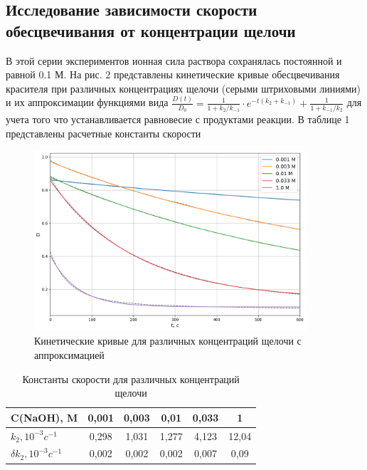 \documentclass[a4paper, 12pt]{article}
\begin{document}
\subsection{Исследование зависимости скорости обесцвечивания от концентрации щелочи}

В этой серии экспериментов ионная сила раствора сохранялась постоянной и равной 0.1 М. На рис. 2 представлены кинетические кривые обесцвечивания красителя при различных концентрациях щелочи (серыми штриховыми линиями) и их аппроксимации функциями вида $\frac{D(t)}{D_0} = \frac{1}{1+k_2/k_{-1}} \cdot e^{-t(k_2+k_{-1})} + \frac{1}{1+k_{-1}/k_2}$ для учета того что устанавливается равновесие с продуктами реакции. В таблице 1 представлены расчетные константы скорости
 \begin{figure}[h!]
    \begin{center}
    \includegraphics[width=0.9\textwidth]{fig2.png}
    \end{center}
    \caption{Кинетические кривые для различных концентраций щелочи с аппроксимацией}
\end{figure}

\begin{table}[h!]
\begin{center}
\caption{Константы скорости для различных концентраций щелочи}
\begin{tabular}{|l|c|c|c|c|c|}
\hline
C(NaOH), M               & 0,001 & 0,003 & 0,01  & 0,033 & 1     \\ \hline
$k_2, 10^{-3} c^{-1}$                       & 0,298 & 1,031 & 1,277 & 4,123 & 12,04 \\ \hline
$\delta k_2, 10^{-3} c^{-1}$  & 0,002 & 0,002 & 0,002 & 0,007 & 0,09  \\ \hline
\end{tabular}
\end{center}
\end{table}
\end{document}
